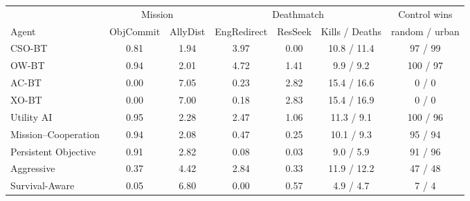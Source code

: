 \begin{tabular}{lcccccc}
\toprule
 & \multicolumn{2}{c}{Mission} & \multicolumn{3}{c}{Deathmatch} & Control wins \\
\cmidrule(lr){2-3}\cmidrule(lr){4-6}\cmidrule(lr){7-7}
Agent & ObjCommit & AllyDist & EngRedirect & ResSeek & Kills / Deaths & random / urban \\
\midrule
CSO-BT & 0.81 & 1.94 & 3.97 & 0.00 & 10.8 / 11.4 & 97 / 99 \\
OW-BT & 0.94 & 2.01 & 4.72 & 1.41 & 9.9 / 9.2 & 100 / 97 \\
AC-BT & 0.00 & 7.05 & 0.23 & 2.82 & 15.4 / 16.6 & 0 / 0 \\
XO-BT & 0.00 & 7.00 & 0.18 & 2.83 & 15.4 / 16.9 & 0 / 0 \\
Utility AI & 0.95 & 2.28 & 2.47 & 1.06 & 11.3 / 9.1 & 100 / 96 \\
\midrule
Mission--Cooperation & 0.94 & 2.08 & 0.47 & 0.25 & 10.1 / 9.3 & 95 / 94 \\
Persistent Objective & 0.91 & 2.82 & 0.08 & 0.03 & 9.0 / 5.9 & 91 / 96 \\
Aggressive & 0.37 & 4.42 & 2.84 & 0.33 & 11.9 / 12.2 & 47 / 48 \\
Survival-Aware & 0.05 & 6.80 & 0.00 & 0.57 & 4.9 / 4.7 & 7 / 4 \\
\bottomrule
\end{tabular}
